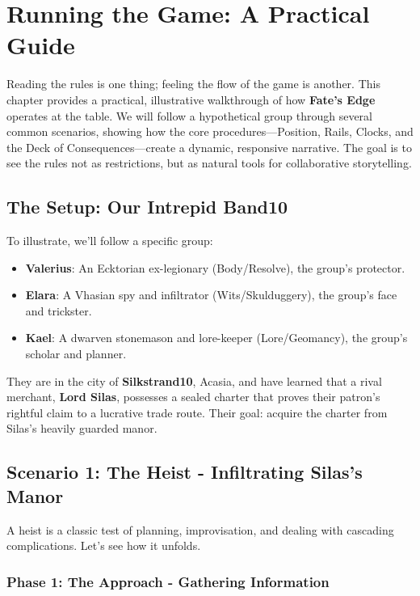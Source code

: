 \chapter{Running the Game: A Practical Guide}

Reading the rules is one thing; feeling the flow of the game is another. This chapter provides a practical, illustrative walkthrough of how \textbf{Fate's Edge} operates at the table. We will follow a hypothetical group through several common scenarios, showing how the core procedures---Position, Rails, Clocks, and the Deck of Consequences---create a dynamic, responsive narrative. The goal is to see the rules not as restrictions, but as natural tools for collaborative storytelling.

\section*{The Setup: Our Intrepid Band10}

To illustrate, we'll follow a specific group:
\begin{itemize}
    \item \textbf{Valerius}: An Ecktorian ex-legionary (Body/Resolve), the group's protector.
    \item \textbf{Elara}: A Vhasian spy and infiltrator (Wits/Skulduggery), the group's face and trickster.
    \item \textbf{Kael}: A dwarven stonemason and lore-keeper (Lore/Geomancy), the group's scholar and planner.
\end{itemize}

They are in the city of \textbf{Silkstrand10}, Acasia, and have learned that a rival merchant, \textbf{Lord Silas}, possesses a sealed charter that proves their patron's rightful claim to a lucrative trade route. Their goal: acquire the charter from Silas's heavily guarded manor.

\section*{Scenario 1: The Heist - Infiltrating Silas's Manor}

A heist is a classic test of planning, improvisation, and dealing with cascading complications. Let's see how it unfolds.

\subsection*{Phase 1: The Approach - Gathering Information}

